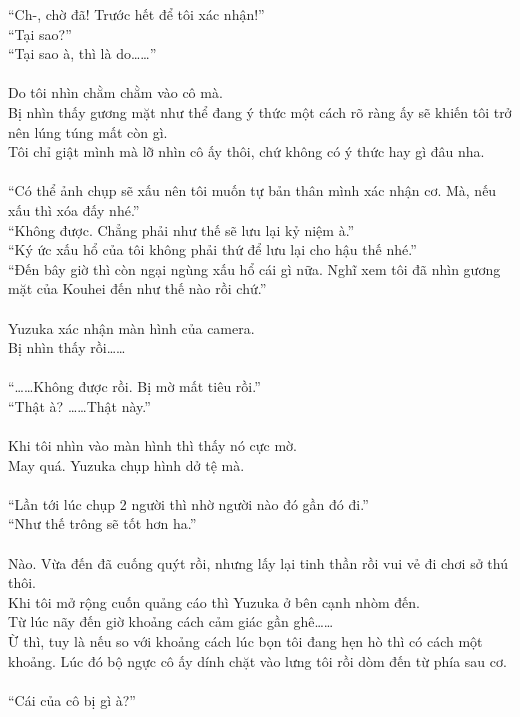 \documentclass[12pt,a4paper, twosides]{book}
\begin{document}
“Ch-, chờ đã! Trước hết để tôi xác nhận!”\\
“Tại sao?”\\
“Tại sao à, thì là do……”\\
\\
Do tôi nhìn chằm chằm vào cô mà.\\
Bị nhìn thấy gương mặt như thể đang ý thức một cách rõ ràng ấy sẽ khiến tôi trở nên lúng túng mất còn gì.\\
Tôi chỉ giật mình mà lỡ nhìn cô ấy thôi, chứ không có ý thức hay gì đâu nha.\\
\\
“Có thể ảnh chụp sẽ xấu nên tôi muốn tự bản thân mình xác nhận cơ. Mà, nếu xấu thì xóa đấy nhé.”\\
“Không được. Chẳng phải như thế sẽ lưu lại kỷ niệm à.”\\
“Ký ức xấu hổ của tôi không phải thứ để lưu lại cho hậu thế nhé.”\\
“Đến bây giờ thì còn ngại ngùng xấu hổ cái gì nữa. Nghĩ xem tôi đã nhìn gương mặt của Kouhei đến như thế nào rồi chứ.”\\
\\
Yuzuka xác nhận màn hình của camera.\\
Bị nhìn thấy rồi……\\
\\
“……Không được rồi. Bị mờ mất tiêu rồi.”\\
“Thật à? ……Thật này.”\\
\\
Khi tôi nhìn vào màn hình thì thấy nó cực mờ.\\
May quá. Yuzuka chụp hình dở tệ mà.\\
\\
“Lần tới lúc chụp 2 người thì nhờ người nào đó gần đó đi.”\\
“Như thế trông sẽ tốt hơn ha.”\\
\\
Nào. Vừa đến đã cuống quýt rồi, nhưng lấy lại tinh thần rồi vui vẻ đi chơi sở thú thôi.\\
Khi tôi mở rộng cuốn quảng cáo thì Yuzuka ở bên cạnh nhòm đến.\\
Từ lúc nãy đến giờ khoảng cách cảm giác gần ghê……\\
Ừ thì, tuy là nếu so với khoảng cách lúc bọn tôi đang hẹn hò thì có cách một khoảng. Lúc đó bộ ngực cô ấy dính chặt vào lưng tôi rồi dòm đến từ phía sau cơ.\\
\\
“Cái của cô bị gì à?”\\
\end{document}
